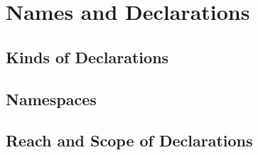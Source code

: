 %
%
%
%

\chapter{Names and Declarations}

\section{Kinds of Declarations}
\section{Namespaces}
\section{Reach and Scope of Declarations}
